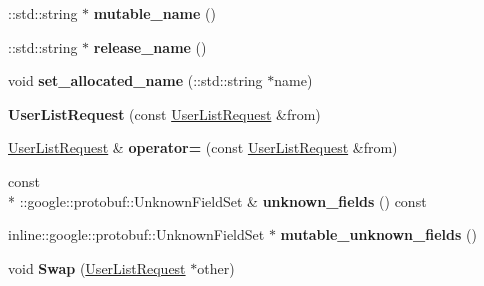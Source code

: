 \begin{DoxyCompactItemize}
\item 
\hypertarget{classSimpleChat_1_1UserListRequest_acc82b59e77de97c14b1540e263947003}{\-::std\-::string $\ast$ {\bfseries mutable\-\_\-name} ()}\label{classSimpleChat_1_1UserListRequest_acc82b59e77de97c14b1540e263947003}

\item 
\hypertarget{classSimpleChat_1_1UserListRequest_af91fbd91f27e9850be1941919a2571d6}{\-::std\-::string $\ast$ {\bfseries release\-\_\-name} ()}\label{classSimpleChat_1_1UserListRequest_af91fbd91f27e9850be1941919a2571d6}

\item 
\hypertarget{classSimpleChat_1_1UserListRequest_a448afb7a3b3c8670983bf410dcaa298b}{void {\bfseries set\-\_\-allocated\-\_\-name} (\-::std\-::string $\ast$name)}\label{classSimpleChat_1_1UserListRequest_a448afb7a3b3c8670983bf410dcaa298b}

\item 
\hypertarget{classSimpleChat_1_1UserListRequest_adf87a872a0904fb5a015a27dc9ed615b}{{\bfseries User\-List\-Request} (const \hyperlink{classSimpleChat_1_1UserListRequest}{User\-List\-Request} \&from)}\label{classSimpleChat_1_1UserListRequest_adf87a872a0904fb5a015a27dc9ed615b}

\item 
\hypertarget{classSimpleChat_1_1UserListRequest_a44923332cb0344abc96ef3adecd31a64}{\hyperlink{classSimpleChat_1_1UserListRequest}{User\-List\-Request} \& {\bfseries operator=} (const \hyperlink{classSimpleChat_1_1UserListRequest}{User\-List\-Request} \&from)}\label{classSimpleChat_1_1UserListRequest_a44923332cb0344abc96ef3adecd31a64}

\item 
\hypertarget{classSimpleChat_1_1UserListRequest_a3e0db8f83f36267008abb4e79b3df138}{const \\*
\-::google\-::protobuf\-::\-Unknown\-Field\-Set \& {\bfseries unknown\-\_\-fields} () const }\label{classSimpleChat_1_1UserListRequest_a3e0db8f83f36267008abb4e79b3df138}

\item 
\hypertarget{classSimpleChat_1_1UserListRequest_aa1fc777d8e850616b3d3ebc023bb5b04}{inline\-::google\-::protobuf\-::\-Unknown\-Field\-Set $\ast$ {\bfseries mutable\-\_\-unknown\-\_\-fields} ()}\label{classSimpleChat_1_1UserListRequest_aa1fc777d8e850616b3d3ebc023bb5b04}

\item 
\hypertarget{classSimpleChat_1_1UserListRequest_ae301e4d1c6d099a73f2b6f9b938234a4}{void {\bfseries Swap} (\hyperlink{classSimpleChat_1_1UserListRequest}{User\-List\-Request} $\ast$other)}\label{classSimpleChat_1_1UserListRequest_ae301e4d1c6d099a73f2b6f9b938234a4}


\end{DoxyCompactItemize}
